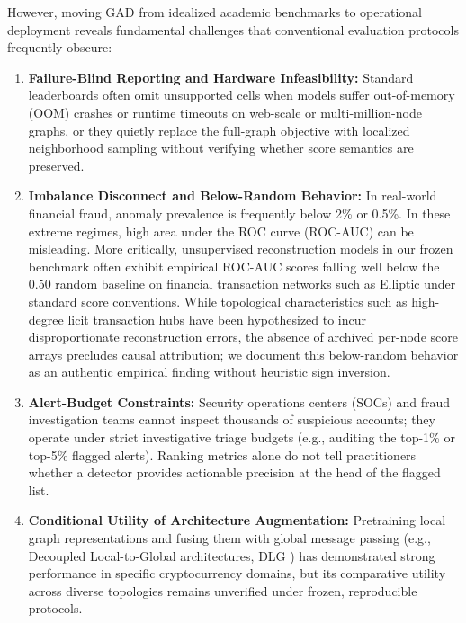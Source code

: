 \documentclass[11pt,a4paper]{article}
\begin{document}
However, moving GAD from idealized academic benchmarks to operational deployment reveals fundamental challenges that conventional evaluation protocols frequently obscure:
\begin{enumerate}
    \item \textbf{Failure-Blind Reporting and Hardware Infeasibility:} Standard leaderboards often omit unsupported cells when models suffer out-of-memory (OOM) crashes or runtime timeouts on web-scale or multi-million-node graphs, or they quietly replace the full-graph objective with localized neighborhood sampling without verifying whether score semantics are preserved.
    \item \textbf{Imbalance Disconnect and Below-Random Behavior:} In real-world financial fraud, anomaly prevalence is frequently below 2\% or 0.5\%. In these extreme regimes, high area under the ROC curve (ROC-AUC) can be misleading. More critically, unsupervised reconstruction models in our frozen benchmark often exhibit empirical ROC-AUC scores falling well below the 0.50 random baseline on financial transaction networks such as Elliptic under standard score conventions. While topological characteristics such as high-degree licit transaction hubs have been hypothesized to incur disproportionate reconstruction errors, the absence of archived per-node score arrays precludes causal attribution; we document this below-random behavior as an authentic empirical finding without heuristic sign inversion.
    \item \textbf{Alert-Budget Constraints:} Security operations centers (SOCs) and fraud investigation teams cannot inspect thousands of suspicious accounts; they operate under strict investigative triage budgets (e.g., auditing the top-1\% or top-5\% flagged alerts). Ranking metrics alone do not tell practitioners whether a detector provides actionable precision at the head of the flagged list.
    \item \textbf{Conditional Utility of Architecture Augmentation:} Pretraining local graph representations and fusing them with global message passing (e.g., Decoupled Local-to-Global architectures, DLG \cite{park2026dlg}) has demonstrated strong performance in specific cryptocurrency domains, but its comparative utility across diverse topologies remains unverified under frozen, reproducible protocols.
\end{enumerate}
\end{document}
